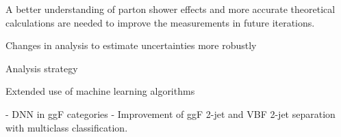 

A better understanding of parton shower effects and more accurate theoretical calculations are needed to improve the measurements in future iterations.~\cite{Jger2020} 

Changes in analysis to estimate uncertainties more robustly

Analysis strategy

Extended use of machine learning algorithms 

- DNN in ggF categories
- Improvement of ggF 2-jet and VBF 2-jet separation with multiclass classification. 

